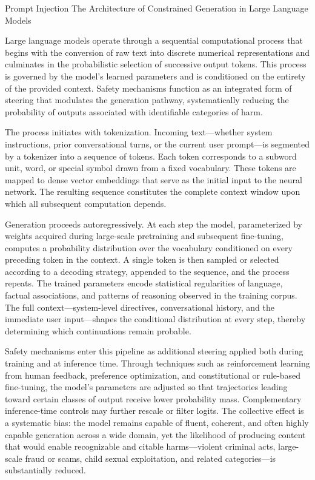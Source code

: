 Prompt Injection
The Architecture of Constrained Generation in Large Language Models

Large language models operate through a sequential computational process that begins with the conversion of raw text into discrete numerical representations and culminates in the probabilistic selection of successive output tokens. This process is governed by the model’s learned parameters and is conditioned on the entirety of the provided context. Safety mechanisms function as an integrated form of steering that modulates the generation pathway, systematically reducing the probability of outputs associated with identifiable categories of harm.

The process initiates with tokenization. Incoming text—whether system instructions, prior conversational turns, or the current user prompt—is segmented by a tokenizer into a sequence of tokens. Each token corresponds to a subword unit, word, or special symbol drawn from a fixed vocabulary. These tokens are mapped to dense vector embeddings that serve as the initial input to the neural network. The resulting sequence constitutes the complete context window upon which all subsequent computation depends.

Generation proceeds autoregressively. At each step the model, parameterized by weights acquired during large-scale pretraining and subsequent fine-tuning, computes a probability distribution over the vocabulary conditioned on every preceding token in the context. A single token is then sampled or selected according to a decoding strategy, appended to the sequence, and the process repeats. The trained parameters encode statistical regularities of language, factual associations, and patterns of reasoning observed in the training corpus. The full context—system-level directives, conversational history, and the immediate user input—shapes the conditional distribution at every step, thereby determining which continuations remain probable.

Safety mechanisms enter this pipeline as additional steering applied both during training and at inference time. Through techniques such as reinforcement learning from human feedback, preference optimization, and constitutional or rule-based fine-tuning, the model’s parameters are adjusted so that trajectories leading toward certain classes of output receive lower probability mass. Complementary inference-time controls may further rescale or filter logits. The collective effect is a systematic bias: the model remains capable of fluent, coherent, and often highly capable generation across a wide domain, yet the likelihood of producing content that would enable recognizable and citable harms—violent criminal acts, large-scale fraud or scams, child sexual exploitation, and related categories—is substantially reduced.


